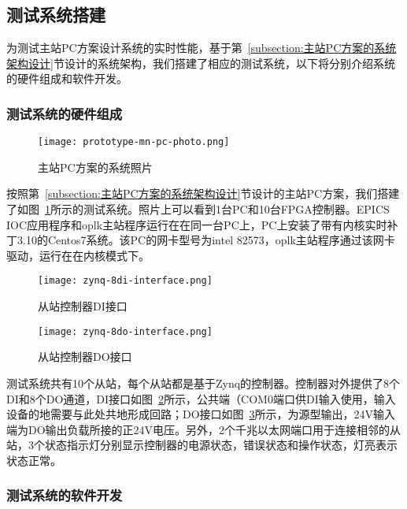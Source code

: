 \subsection{测试系统搭建}

为测试主站PC方案设计系统的实时性能，基于第~\ref{subsection:主站PC方案的系统架构设计}节设计的系统架构，我们搭建了相应的测试系统，以下将分别介绍系统的硬件组成和软件开发。

\subsubsection{测试系统的硬件组成} 

\begin{figure}[!htb]
  \centering
  \texttt{[image: prototype-mn-pc-photo.png]}
  \caption{主站PC方案的系统照片}
  \label{fig:prototype-mn-pc-photo}
\end{figure}

按照第~\ref{subsection:主站PC方案的系统架构设计}节设计的主站PC方案，我们搭建了如图~\ref{fig:prototype-mn-pc-photo}所示的测试系统。照片上可以看到1台PC和10台FPGA控制器。EPICS IOC应用程序和oplk主站程序运行在在同一台PC上，PC上安装了带有内核实时补丁3.10的Centos7系统。该PC的网卡型号为intel 82573，oplk主站程序通过该网卡驱动，运行在在内核模式下。

\begin{figure}[!htb]
  \centering
  \texttt{[image: zynq-8di-interface.png]}
  \caption{从站控制器DI接口}
  \label{fig:zynq-8di-interface}
\end{figure}

\begin{figure}[!htb]
  \centering
  \texttt{[image: zynq-8do-interface.png]}
  \caption{从站控制器DO接口}
  \label{fig:zynq-8do-interface}
\end{figure}

测试系统共有10个从站，每个从站都是基于Zynq的控制器。控制器对外提供了8个DI和8个DO通道，DI接口如图~\ref{fig:zynq-8di-interface}所示，公共端（COM0端口供DI输入使用，输入设备的地需要与此处共地形成回路；DO接口如图~\ref{fig:zynq-8do-interface}所示，为源型输出，24V输入端为DO输出负载所接的正24V电压。另外，2个千兆以太网端口用于连接相邻的从站，3个状态指示灯分别显示控制器的电源状态，错误状态和操作状态，灯亮表示状态正常。

\subsubsection{测试系统的软件开发}

